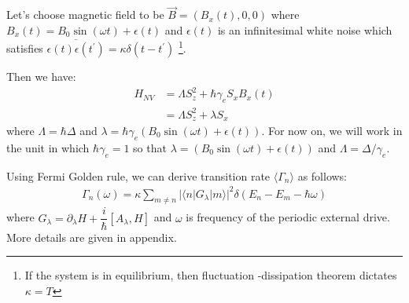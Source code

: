 \documentclass[11pt,a4paper]{article}
\begin{document}
Let's choose magnetic field to be $\vec{B}= (B_x (t), 0, 0)$ where $B_x(t)= B_0 \sin (\omega t) + \epsilon(t)$ and  $\epsilon(t)$ is an infinitesimal white noise which satisfies $\overline{ \epsilon(t) \epsilon(t^{\prime})}= \kappa \delta(t -t^{\prime})$ \footnote{If the system is in equilibrium, then fluctuation -dissipation theorem dictates $\kappa = T$}. 

Then we have: 
\begin{align*}
H_{NV} &= \Lambda S_z^2 + \hbar \gamma_e   S_x  B_x(t) \\
 &=  \Lambda S_z^2 + \lambda   S_x  
\end{align*}
where $\Lambda= \hbar \Delta $ and $\lambda=\hbar \gamma_e (B_0 \sin (\omega t) + \epsilon(t))$. For now on, we will work in the unit in which $\hbar \gamma_e =1$ so that  $\lambda= (B_0 \sin (\omega t) + \epsilon(t))$ and $\Lambda=  \Delta / \gamma_e $.

Using Fermi Golden rule, we can derive transition rate $\langle \Gamma_n \rangle$ \cite{kolodrubetz2016geometry} as follows: 
\begin{align}
 \Gamma_n (\omega) = \kappa  \sum_{m \neq n} |\langle n | G_{\lambda} | m \rangle |^2 \delta(E_n-E_m- \hbar \omega)
\end{align}
where $G_{\lambda}= \partial_{\lambda} H + \dfrac{i}{\hbar} [A_{\lambda}, H]$ and  $\omega$ is frequency of the periodic external drive. More details are given in appendix.


\appendix
\end{document}
